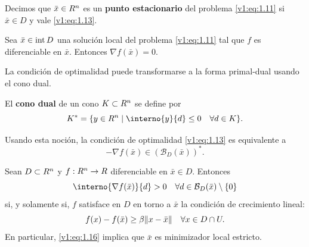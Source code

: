 Decimos que $\bar{x} \in R^n$ es un \textbf{punto estacionario} del problema \eqref{v1:eq:1.11} si $\bar{x} \in D$ y vale \eqref{v1:eq:1.13}. 

\begin{corollary}\label{v1:cor:1.4.1}
 Sea $\bar{x} \in \operatorname{\operatorname{int}} D$ una solución local del problema \eqref{v1:eq:1.11} tal que $f$ es diferenciable en $\bar{x}$. Entonces $\nabla f(\bar{x}) = 0$.
\end{corollary}

La condición de optimalidad puede transformarse a la forma primal-dual usando el cono dual.

\begin{definition}\label{v1:def:1.4.5}
 El \textbf{cono dual} de un cono $K \subset R^n$ se define por
 \[
 K^* = \{y \in \Rn \mid \interno{y}{d} \le 0 \quad \forall d \in K\}.
 \]
\end{definition}

Usando esta noción, la condición de optimalidad \eqref{v1:eq:1.13} es equivalente a
\begin{equation}
 -\nabla f(\bar{x}) \in (\mathcal{B}_D(\bar{x}))^*. \label{v1:eq:1.14}
\end{equation}

\begin{center}
\end{center}

\begin{theorem}\label{v1:thm:1.4.2}
 Sean $D \subset R^n$ y $f : R^n \to R$ diferenciable en $\bar{x} \in D$. Entonces
 \begin{equation}
 \interno{\nabla f(\bar{x})}{d} > 0 \quad \forall d \in \mathcal{B}_D(\bar{x}) \setminus \{0\} \label{v1:eq:1.15}
 \end{equation}
 si, y solamente si, $f$ satisface en $D$ en torno a $\bar{x}$ la condición de crecimiento lineal:
 \begin{equation}
 f(x) - f(\bar{x}) \ge \beta \lVert x - \bar{x}\rVert \quad \forall x \in D \cap U. \label{v1:eq:1.16}
 \end{equation}
 En particular, \eqref{v1:eq:1.16} implica que $\bar{x}$ es minimizador local estricto.
\end{theorem}

